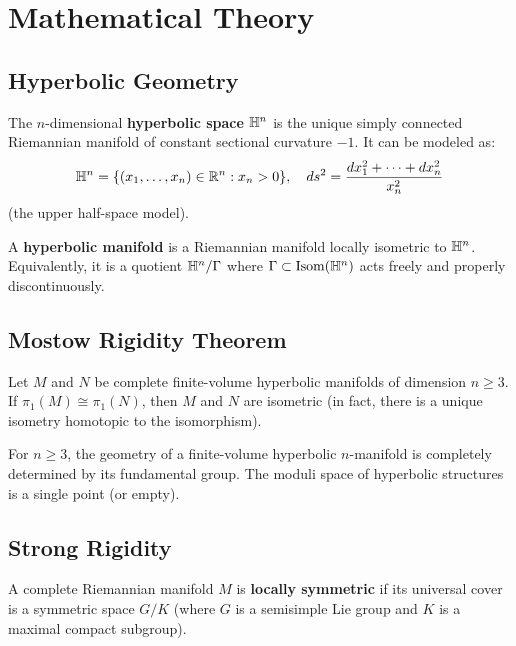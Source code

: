 \section{Mathematical Theory}

\subsection{Hyperbolic Geometry}

\begin{definition}
The $n$-dimensional \textbf{hyperbolic space} $\mathbb{H}^n$ is the unique simply connected Riemannian manifold of constant sectional curvature $-1$. It can be modeled as:
\[
\mathbb{H}^n = \{ (x_1, \ldots, x_n) \in \mathbb{R}^n : x_n > 0 \}, \quad ds^2 = \frac{dx_1^2 + \cdots + dx_n^2}{x_n^2}
\]
(the upper half-space model).
\end{definition}

\begin{definition}
A \textbf{hyperbolic manifold} is a Riemannian manifold locally isometric to $\mathbb{H}^n$. Equivalently, it is a quotient $\mathbb{H}^n / \Gamma$ where $\Gamma \subset \operatorname{Isom}(\mathbb{H}^n)$ acts freely and properly discontinuously.
\end{definition}

\subsection{Mostow Rigidity Theorem}

\begin{theorem}
Let $M$ and $N$ be complete finite-volume hyperbolic manifolds of dimension $n \geq 3$. If $\pi_1(M) \cong \pi_1(N)$, then $M$ and $N$ are isometric (in fact, there is a unique isometry homotopic to the isomorphism).
\end{theorem}

\begin{corollary}
For $n \geq 3$, the geometry of a finite-volume hyperbolic $n$-manifold is completely determined by its fundamental group. The moduli space of hyperbolic structures is a single point (or empty).
\end{corollary}

\subsection{Strong Rigidity}

\begin{definition}
A complete Riemannian manifold $M$ is \textbf{locally symmetric} if its universal cover is a symmetric space $G/K$ (where $G$ is a semisimple Lie group and $K$ is a maximal compact subgroup).
\end{definition}

